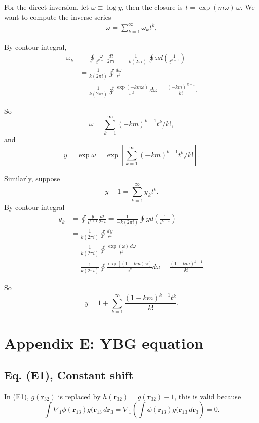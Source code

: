 \documentclass[preprint]{revtex4-1}
\numberwithin{equation}{subsection}
\numberwithin{table}{section}
\newcommand{\vct}[1]{\mathbf{#1}}
\providecommand{\vr}{} %
\renewcommand{\vr}{\vct{r}}
\begin{document}
For the direct inversion,
let $\omega \equiv \log y$,
then the closure is $t = \exp(m \omega) \, \omega$.
%
We want to compute the inverse series
\begin{align*}
  \omega = \sum_{k=1}^\infty \omega_k t^k,
\end{align*}

By contour integral,
\begin{align*}
\omega_k
&=
\oint \frac{\omega}{t^{k+1}} \frac{dt}{2\pi i}
=
\frac{1}{-k (2\pi i)} \oint \omega d\left(\frac{1}{t^{k+1}}\right)
\\
&=
\frac{1}{k (2\pi i)} \oint \frac{ d\omega }{t^{k}}
\\
&=
\frac{1}{k (2\pi i)} \oint \frac{ \exp( -k m\omega)  }{\omega^{k}} d\omega
=
\frac{ (-k m)^{k-1} }
     { k! }.
\end{align*}

So
\[
  \omega = \sum_{k=1}^\infty (-k m)^{k-1} t^k / k!,
\]
and
\[
  y
= \exp \omega
= \exp\left[ \sum_{k=1}^\infty (-k m)^{k-1} t^k / k! \right].
\]


Similarly, suppose
\[
  y - 1
=
\sum_{k = 1}^\infty y_k t^k.
\]
By contour integral
\begin{align*}
y_k
&=
\oint \frac{y}{t^{k+1}} \frac{dt}{2\pi i}
=
\frac{1}{-k (2\pi i)} \oint y d\left(\frac{1}{t^{k+1}}\right)
\\
&=
\frac{1}{k (2\pi i)} \oint \frac{ dy }{t^{k}}
\\
&=
\frac{1}{k (2\pi i)} \oint \frac{ \exp(\omega) \, d\omega }{t^{k}}
\\
&=
\frac{1}{k (2\pi i)} \oint \frac{ \exp[(1 - k m) \omega]  }{\omega^{k}} d\omega
=
\frac{ (1-k m)^{k-1} }
     { k! }.
\end{align*}

So
\[
  y
=
1 + \sum_{k = 1}^\infty
\frac{ (1 - k m)^{k-1} t^k } { k! }.
\]




\section{Appendix E: YBG equation}

\subsection{Eq. (E1), Constant shift}

In (E1), $g(\vr_{32})$ is replaced by $h(\vr_{32}) = g(\vr_{32}) - 1$,
this is valid because
\[
 \int \nabla_1 \phi(\vr_{13}) g(\vr_{13} \, d\vr_3
= \nabla_1 \left( \int \phi(\vr_{13}) g(\vr_{13} \, d\vr_3 \right)
= 0.
\]
\end{document}
